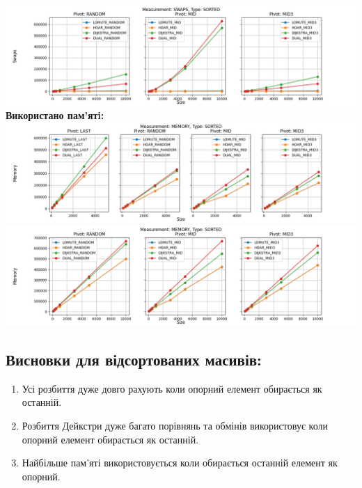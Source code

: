 \documentclass{article}
\begin{document}
        \includegraphics[scale=0.5]{sorted_Swaps_3_pivots_7_numbers.png}
        \newline
    \newpage
    \textbf{Використано пам’ятi:}
    \newline
        \includegraphics[scale=0.5]{sorted_Memory_6_numbers.png}
        \includegraphics[scale=0.5]{sorted_Memory_3_pivots_7_numbers.png}
    \subsection{Висновки для відсортованих масивів:}
    \begin{enumerate}
        \item Усі розбиття дуже довго рахують коли опорний елемент обирається як останній.
        \item Розбиття Дейкстри дуже багато порівнянь та обмінів використовує коли опорний елемент обирається як останній.
        \item Найбільше пам'яті використовується коли обирається останній елемент як опорний.
    \end{enumerate}
    \newpage

\end{document}
